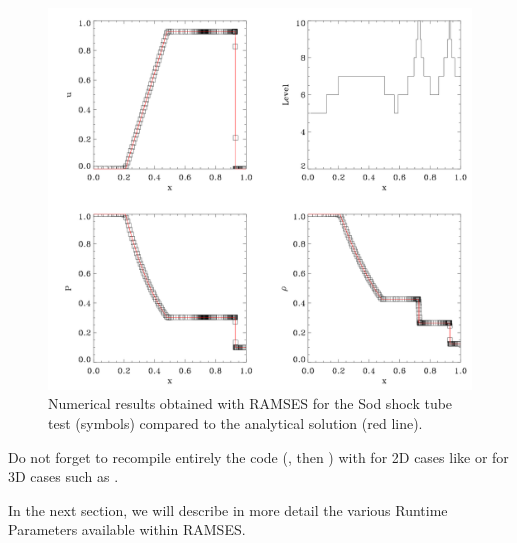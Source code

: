 \begin{figure}
   \includegraphics[width=\textwidth]{img/sod.png}
   \caption{Numerical results obtained with RAMSES for the Sod shock
tube test (symbols) compared to the analytical solution (red line).}
   \label{fig:sod1d}
\end{figure}


\begin{warning}
   Do not forget to recompile entirely the code (, then
) with  for 2D cases like  or
 for 3D cases such as .
\end{warning}

In the next section, we will describe in more detail the various
Runtime Parameters available within RAMSES.
